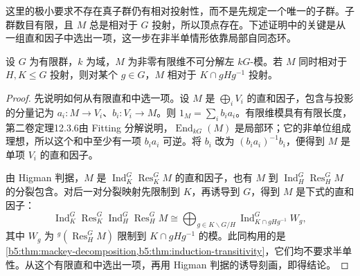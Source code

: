 这里的极小要求不存在真子群仍有相对投射性，而不是先规定一个唯一的子群。子群数目有限，且 \(M\) 总是相对于 \(G\) 投射，所以顶点存在。下述证明中的关键是从一组直和因子中选出一项，这一步在非半单情形依靠局部自同态环。

\begin{lemma}\label{b5:lem:relative-intersection}
	设 \(G\) 为有限群，\(k\) 为域，\(M\) 为非零有限维不可分解左 \(kG\)-模。若 \(M\) 同时相对于 \(H,K\le G\) 投射，则对某个 \(g\in G\)，\(M\) 相对于 \(K\cap gHg^{-1}\) 投射。
\end{lemma}
\begin{proof}
	先说明如何从有限直和中选一项。设 \(M\) 是 \(\bigoplus_iV_i\) 的直和因子，包含与投影的分量记为 \(a_i:M\to V_i\)、\(b_i:V_i\to M\)。则 \(1_M=\sum_ib_ia_i\)。有限维模具有有限长度，第二卷定理12.3.6由 Fitting 分解说明，\(\operatorname{End}_{kG}(M)\) 是局部环；它的非单位组成理想，所以这个和中至少有一项 \(b_ia_i\) 可逆。将 \(b_i\) 改为 \((b_ia_i)^{-1}b_i\)，便得到 \(M\) 是单项 \(V_i\) 的直和因子。

	由 Higman 判据，\(M\) 是 \(\operatorname{Ind}_K^G\operatorname{Res}_K^G M\) 的直和因子，也有 \(M\) 到 \(\operatorname{Ind}_H^G\operatorname{Res}_H^G M\) 的分裂包含。对后一对分裂映射先限制到 \(K\)，再诱导到 \(G\)，得到 \(M\) 是下式的直和因子：
	\[
		\operatorname{Ind}_K^G\operatorname{Res}_K^G
		\operatorname{Ind}_H^G\operatorname{Res}_H^G M
		\cong\bigoplus_{g\in K\backslash G/H}\operatorname{Ind}_{K\cap gHg^{-1}}^G W_g,
	\]
	其中 \(W_g\) 为 \({}^g(\operatorname{Res}_H^G M)\) 限制到 \(K\cap gHg^{-1}\) 的模。此同构用的是\cref{b5:thm:mackey-decomposition,b5:thm:induction-transitivity}，它们均不要求半单性。从这个有限直和中选出一项，再用 Higman 判据的诱导刻画，即得结论。
\end{proof}

